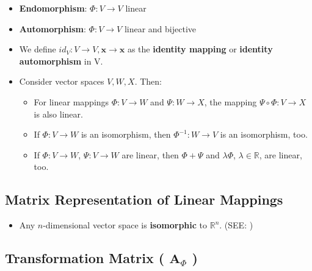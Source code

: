 \begin{itemize}
    \item \textbf{Endomorphism}: $\Phi : V \to V$ linear

    \item \textbf{Automorphism}: $\Phi : V \to V$ linear and bijective

    \item We define $id_V : V \to V , \mathbf{x} \to \mathbf{x}$ as the \textbf{identity mapping} or \textbf{identity automorphism} in V.

    \item Consider vector spaces $V, W, X$. Then:
    \begin{itemize}
        \item For linear mappings $\Phi : V \to W$ and $\Psi : W \to X$, the mapping $\Psi \circ \Phi : V \to X$ is also linear.

        \item If $\Phi : V \to W$ is an isomorphism, then $\Phi^{-1} : W \to V$ is an isomorphism, too.

        \item If $\Phi : V \to W$, $\Psi : V \to W$ are linear, then $\Phi + \Psi$ and $\lambda\Phi$, $\lambda \in \mathbb{R}$, are linear, too.
    \end{itemize}
    
\end{itemize}

\subsection{Matrix Representation of Linear Mappings \cite{mfml-1}}\label{Matrix Representation of Linear Mappings}

\begin{itemize}
    \item Any $n$-dimensional vector space is \textbf{isomorphic} to $\mathbb{R}^n$. (SEE: )
    
\end{itemize}

\subsection{Transformation Matrix ( $\mathbf{A}_\Phi$ ) \cite{mfml-1}}\label{Transformation Matrix}

